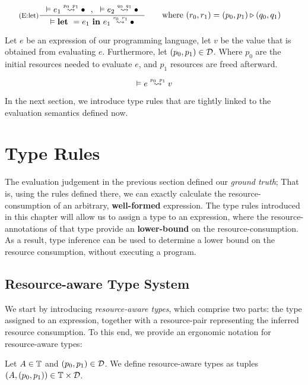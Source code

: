 \[
   \inference[(E:let)]
   {\evals{}{e_1}{\bullet}{p_0}{p_1} ~~,~~ \evals{}{e_2}{\bullet}{q_0}{q_1}}
   {\evals{}{\letexp{}{e_1}{e_1}}{\bullet}{r_0}{r_1}}
   \qquad
   \begin{aligned}
      \text{where }  &(r_0, r_1) = (p_0, p_1) \sequence (q_0, q_1) 
   \end{aligned}
\]


\begin{definition}\label{def:evaluation-judgement}
   Let \(e\) be an expression of our programming language, let \(v\) be the value that is obtained from evaluating \(e\). Furthermore, let \((p_0, p_1) \in \mathcal{D}\). 
   Where \(p_0\) are the initial resources needed to evaluate \(e\), and \(p_1\) resources are freed afterward.
   
   \[
      \evals{}{e}{v}{p_0}{p_1}
   \]
\end{definition}

In the next section, we introduce type rules that are tightly linked to the evaluation semantics defined now. 

\section{Type Rules}
The evaluation judgement in the previous section defined our \emph{ground truth}; That is, using the rules defined there, we can exactly calculate the resource-consumption of an arbitrary, \textbf{well-formed} expression. The type rules introduced in this chapter will allow us to assign a type to an expression, where the resource-annotations of that type provide an \textbf{lower-bound} on the resource-consumption. As a result, type inference can be used to determine a lower bound on the resource consumption, without executing a program.

\subsection{Resource-aware Type System}

We start by introducing \emph{resource-aware types}, which comprise two parts: the type assigned to an expression, together with a resource-pair representing the inferred resource consumption. To this end, we provide an ergonomic notation for resource-aware types:

\begin{definition}\label{def:ra-type}
   Let \(A \in \mathbb{T}\) and \((p_0, p_1) \in \mathcal{D}\). We define resource-aware types as tuples \((A, (p_0, p_1)) \in \mathbb{T} \times \mathcal{D}\).
\end{definition}

